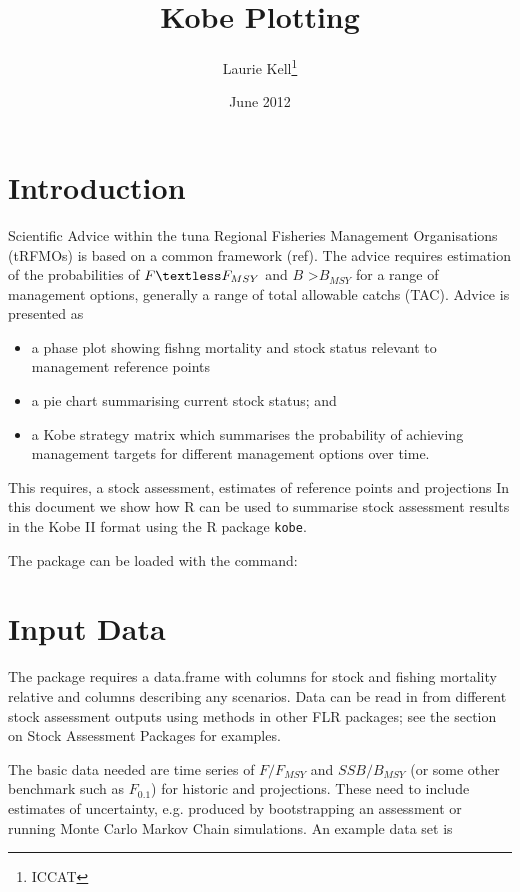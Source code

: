 \documentclass[a4paper, 11pt, oldtoc]{artikel1}
\begin{document}
\title{Kobe Plotting}
\author{Laurie Kell\footnote{ICCAT}}
\date{June 2012}
\maketitle
\tableofcontents

\section{Introduction}

Scientific Advice within the tuna Regional Fisheries Management Organisations (tRFMOs) is based on a common framework 
(ref). The advice requires estimation of the probabilities of $F \textless F_{MSY}$ and
$B$ \textgreater $B_{MSY}$ for a range of management options, generally a range of total allowable catchs (TAC). Advice is presented as 

\begin{itemize}
 \item a phase plot showing fishng mortality and stock status relevant to management reference points
 \item a pie chart summarising current stock status; and 
 \item a Kobe strategy matrix which summarises the probability of achieving management targets for different management options over time.
\end{itemize}

This requires, a stock assessment, estimates of reference points and projections
In this document we show how R can be used to summarise stock assessment results in the Kobe II format using the R package \texttt{kobe}. 

The package can be loaded with the command:


\section{Input Data}

The package requires a data.frame with columns for stock and fishing mortality relative and columns describing
any scenarios. Data can be read in from different stock assessment outputs using methods 
in other FLR packages; see the section on Stock Assessment Packages for examples.

The basic data needed are time series of $F/F_{MSY}$ and $SSB/B_{MSY}$ (or some other benchmark such as $F_{0.1}$)
for historic and projections. These need to include estimates of uncertainty, e.g. produced by bootstrapping an
assessment or running Monte Carlo Markov Chain simulations. An example data set is
\end{document}
